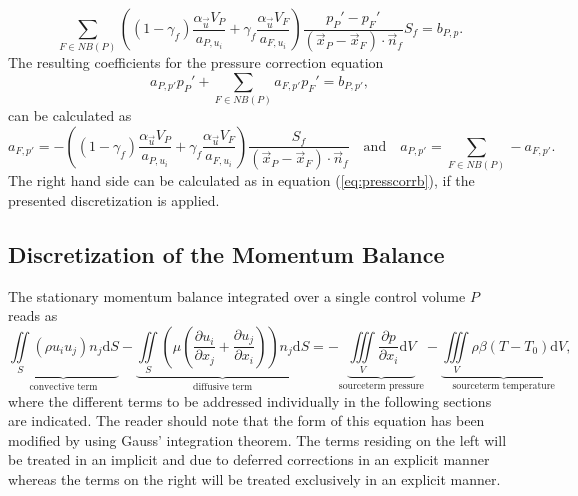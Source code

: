   \begin{equation}
    \label{eq:presscorr}
    \sum_{F \in NB(P)} \left(\left(1 - \gamma_f\right) \frac{\alpha_\vec{u} V_P}{a_{P,u_i}} + \gamma_f \frac{\alpha_\vec{u} V_F}{a_{F,u_i}}\right)
     \frac{p_P' - p_F'}{\left(\vec{x}_P - \vec{x}_F\right)\cdot \vec{n}_f} S_f
    = b_{P,p}.
  \end{equation}
  The resulting coefficients for the pressure correction equation
  \begin{displaymath}
    a_{P,p'} p_{P}' + \sum_{F \in NB(P)} a_{F,p'} p_{F}' = b_{P,p'},
  \end{displaymath}
  can be calculated as
  \begin{displaymath}
    a_{F,p'} = -\left(\left(1 - \gamma_f\right) \frac{\alpha_\vec{u} V_P}{a_{P,u_i}} + \gamma_f \frac{\alpha_\vec{u} V_F}{a_{F,u_i}}\right) \frac{S_f}{\left(\vec{x}_P - \vec{x}_F\right) \cdot \vec{n}_f} \quad \text{and} \quad
    a_{P,p'} = \sum_{F \in NB(P)} -a_{F,p'}.
  \end{displaymath}
  The right hand side can be calculated as in equation (\ref{eq:presscorrb}), if the presented discretization is applied. 

  \subsection{Discretization of the Momentum Balance}
  \label{sec:segdiscretization}

      The stationary momentum balance integrated over a single control volume \(P\) reads as
      \begin{equation}
        \label{eq:semidiscrete}
        \underbrace{\iint\limits_S (\rho u_i u_j)n_j \mathrm{d}S}_{\text{convective term}}
        - \underbrace{\iint\limits_S \left(\mu \left( \frac{\partial u_i}{\partial x_j} + \frac{\partial u_j}{\partial x_i}\right)\right)n_j \mathrm{d}S}_{\text{diffusive term}}
        = - \underbrace{\iiint\limits_V \frac{\partial p}{\partial x_i} \mathrm{d}V}_{\text{sourceterm pressure}}
        - \underbrace{\iiint\limits_V \rho \beta \left(T - T_0\right) \mathrm{d}V}_{\text{sourceterm temperature}},
      \end{equation}
      where the different terms to be addressed individually in the following sections are indicated. The reader should note that the form of this equation has been modified by using Gauss' integration theorem. The terms residing on the left will be treated in an implicit and due to deferred corrections in an explicit manner whereas the terms on the right will be treated exclusively in an  explicit manner.


